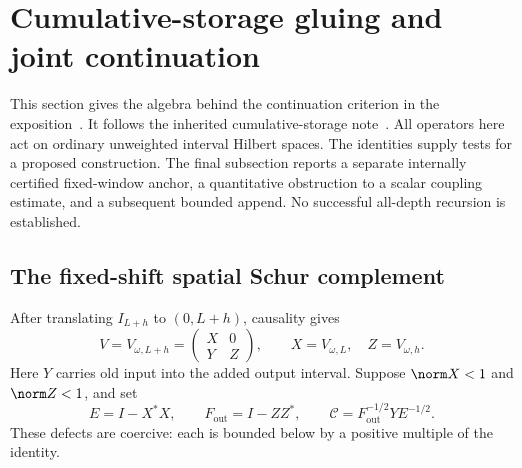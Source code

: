\section{Cumulative-storage gluing and joint continuation}\label{sec:continuation}

This section gives the algebra behind the continuation criterion in
the exposition~\cite{Exposition}. It follows the inherited
cumulative-storage note~\cite{CumulativePath}. All operators here
act on ordinary unweighted interval Hilbert spaces. The identities
supply tests for a proposed construction. The final subsection reports
a separate internally certified fixed-window anchor, a quantitative
obstruction to a scalar coupling estimate, and a subsequent bounded append. No successful all-depth recursion
is established.

\subsection{The fixed-shift spatial Schur complement}

After translating $I_{L+h}$ to $(0,L+h)$, causality gives
\begin{equation}\label{eq:si-block}
 V=V_{\omega,L+h}=
 \begin{pmatrix}X&0\\Y&Z\end{pmatrix},
 \qquad X=V_{\omega,L},\quad Z=V_{\omega,h}.
\end{equation}
Here $Y$ carries old input into the added output interval.
Suppose $\norm X<1$ and $\norm Z<1$, and set
\[
 E=I-X^*X,\qquad F_{\mathrm{out}}=I-ZZ^*,
 \qquad \mathcal C=F_{\mathrm{out}}^{-1/2}YE^{-1/2}.
\]
These defects are coercive: each is bounded below by a positive
multiple of the identity.


